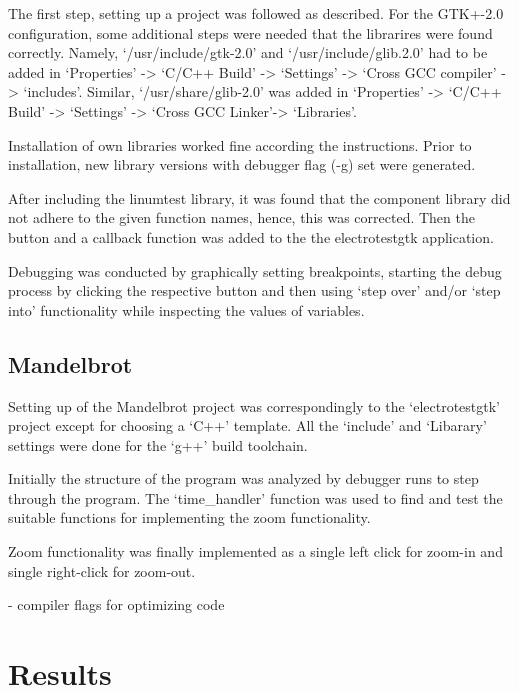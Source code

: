 \documentclass[a4paper,11pt,twoside]{article}
\begin{document}
The first step, setting up a project was followed as described. For the GTK+-2.0
configuration, some additional steps were needed that the librarires were found
correctly. Namely, `/usr/include/gtk-2.0' and `/usr/include/glib.2.0' had to be
added in `Properties' -> `C/C++ Build' -> `Settings' ->  `Cross GCC compiler' ->
`includes'. Similar, `/usr/share/glib-2.0' was added in `Properties' -> `C/C++
Build' ->  `Settings' -> `Cross GCC Linker'-> `Libraries'.

Installation of own libraries worked fine according the instructions. Prior to
installation, new library versions with debugger flag (-g) set were generated.

After including the linumtest library, it was found that the component library
did not adhere to the given function names, hence, this was corrected. Then
the button and a callback function was added to the the electrotestgtk application.

Debugging was conducted by graphically setting breakpoints, starting the debug
process by clicking the respective button and then using `step over' and/or
`step into' functionality while inspecting the values of variables.

\subsection{Mandelbrot}
Setting up of the Mandelbrot project was correspondingly to the `electrotestgtk'
project except for choosing a `C++' template. All the `include' and `Libarary'
settings were done for the `g++' build toolchain.

Initially the structure of the program was analyzed by debugger runs to step
through the program. The `time_handler' function was used to find and test the
suitable functions for implementing the zoom functionality.

Zoom functionality was finally implemented as a single left click for zoom-in
and single right-click for zoom-out. 



- compiler flags for optimizing code
\section{Results}
\end{document}
